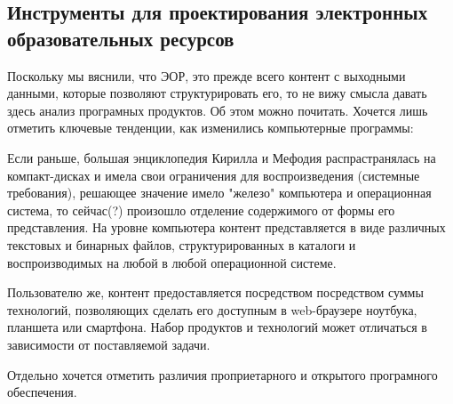 \large
\newpage
\large
\subsection{Инструменты для проектирования электронных образовательных ресурсов}
Поскольку мы вяснили, что ЭОР, это прежде всего контент с выходными данными, которые позволяют структурировать его, то не вижу смысла давать здесь анализ програмных продуктов. Об этом можно почитать\cite{mahmutova19, larin}. Хочется лишь отметить ключевые тенденции, как изменились компьютерные программы: 

Если раньше, большая энциклопедия Кирилла и Мефодия распрастранялась на компакт-дисках и имела свои ограничения для воспроизведения (системные требования), решающее значение имело "железо" компьютера и операционная система, то сейчас(?) произошло отделение содержимого от формы его представления. На уровне компьютера контент представляется в виде различных текстовых и бинарных файлов, структурированных в каталоги и воспроизводимых на любой в любой операционной системе. 

Пользователю же, контент предоставляется посредством посредством суммы технологий, позволяющих сделать его доступным в web-браузере ноутбука, планшета или смартфона. Набор продуктов и технологий может отличаться в зависимости от поставляемой задачи. 

Отдельно хочется отметить различия проприетарного и открытого програмного обеспечения.

